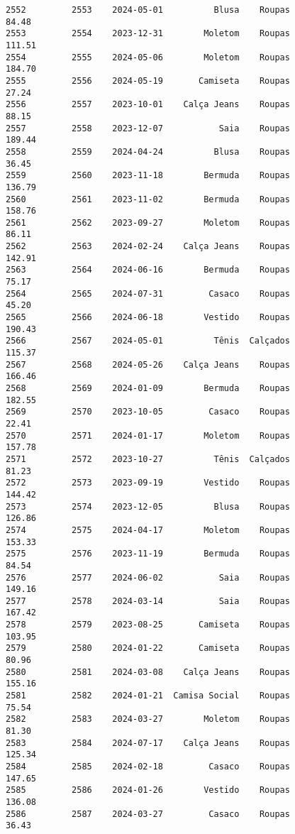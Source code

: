 \documentclass[11pt]{article}
\begin{document}
\begin{Verbatim}[commandchars=\\\{\}]
2552         2553    2024-05-01          Blusa    Roupas           84.48   
2553         2554    2023-12-31        Moletom    Roupas          111.51   
2554         2555    2024-05-06        Moletom    Roupas          184.70   
2555         2556    2024-05-19       Camiseta    Roupas           27.24   
2556         2557    2023-10-01    Calça Jeans    Roupas           88.15   
2557         2558    2023-12-07           Saia    Roupas          189.44   
2558         2559    2024-04-24          Blusa    Roupas           36.45   
2559         2560    2023-11-18        Bermuda    Roupas          136.79   
2560         2561    2023-11-02        Bermuda    Roupas          158.76   
2561         2562    2023-09-27        Moletom    Roupas           86.11   
2562         2563    2024-02-24    Calça Jeans    Roupas          142.91   
2563         2564    2024-06-16        Bermuda    Roupas           75.17   
2564         2565    2024-07-31         Casaco    Roupas           45.20   
2565         2566    2024-06-18        Vestido    Roupas          190.43   
2566         2567    2024-05-01          Tênis  Calçados          115.37   
2567         2568    2024-05-26    Calça Jeans    Roupas          166.46   
2568         2569    2024-01-09        Bermuda    Roupas          182.55   
2569         2570    2023-10-05         Casaco    Roupas           22.41   
2570         2571    2024-01-17        Moletom    Roupas          157.78   
2571         2572    2023-10-27          Tênis  Calçados           81.23   
2572         2573    2023-09-19        Vestido    Roupas          144.42   
2573         2574    2023-12-05          Blusa    Roupas          126.86   
2574         2575    2024-04-17        Moletom    Roupas          153.33   
2575         2576    2023-11-19        Bermuda    Roupas           84.54   
2576         2577    2024-06-02           Saia    Roupas          149.16   
2577         2578    2024-03-14           Saia    Roupas          167.42   
2578         2579    2023-08-25       Camiseta    Roupas          103.95   
2579         2580    2024-01-22       Camiseta    Roupas           80.96   
2580         2581    2024-03-08    Calça Jeans    Roupas          155.16   
2581         2582    2024-01-21  Camisa Social    Roupas           75.54   
2582         2583    2024-03-27        Moletom    Roupas           81.30   
2583         2584    2024-07-17    Calça Jeans    Roupas          125.34   
2584         2585    2024-02-18         Casaco    Roupas          147.65   
2585         2586    2024-01-26        Vestido    Roupas          136.08   
2586         2587    2024-03-27         Casaco    Roupas           36.43   

\end{Verbatim}
\end{document}
